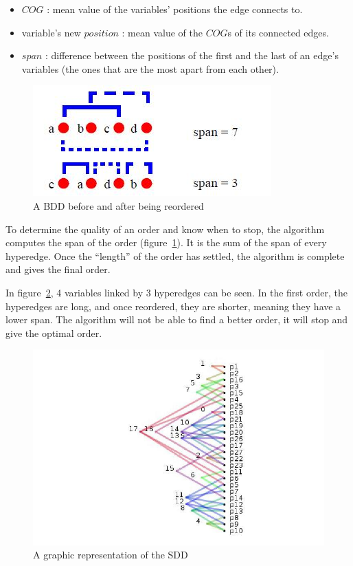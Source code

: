 \documentclass[12pt]{report}
\begin{document}
\begin{itemize}
  \item $COG$ : mean value of the variables' positions the edge connects to.
  \item variable's new $position$ : mean value of the $COG$s of its connected edges.
  \item $span$ : difference between the positions of the first and the last of an edge's variables (the ones that are the most apart from each other).
\end{itemize}

\begin{figure}[!h]
  \centering
  \includegraphics[scale=0.7]{images/force_span.jpg}
  \caption{A BDD before and after being reordered}
  \label{force_span}
\end{figure}

To determine the quality of an order and know when to stop, the algorithm computes the span of the order (figure~\ref{force_span}). It is the sum of the span of every hyperedge. Once the \enquote{length} of the order has settled, the algorithm is complete and gives the final order.

In figure~\ref{order_graph}, 4 variables linked by 3 hyperedges can be seen. In the first order, the hyperedges are long, and once reordered, they are shorter, meaning they have a lower span. The algorithm will not be able to find a better order, it will stop and give the optimal order.

\begin{figure}[!h]
  \centering
  \includegraphics[scale=0.5]{images/representation_order.jpg}
  \caption{A graphic representation of the SDD}
  \label{order_graph}
\end{figure}
\end{document}
